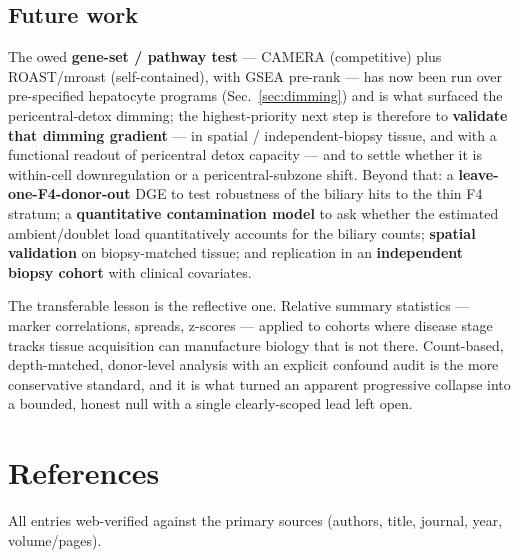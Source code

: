 \documentclass[11pt,a4paper]{article}
\begin{document}
\subsection{Future work}

The owed \textbf{gene-set / pathway test} --- CAMERA (competitive) plus ROAST/mroast (self-contained), with GSEA pre-rank --- has now been run over pre-specified hepatocyte programs (Sec.\ \ref{sec:dimming}) and is what surfaced the pericentral-detox dimming; the highest-priority next step is therefore to \textbf{validate that dimming gradient} --- in spatial / independent-biopsy tissue, and with a functional readout of pericentral detox capacity --- and to settle whether it is within-cell downregulation or a pericentral-subzone shift. Beyond that: a \textbf{leave-one-F4-donor-out} DGE to test robustness of the biliary hits to the thin F4 stratum; a \textbf{quantitative contamination model} to ask whether the estimated ambient/doublet load quantitatively accounts for the biliary counts; \textbf{spatial validation} on biopsy-matched tissue; and replication in an \textbf{independent biopsy cohort} with clinical covariates.

The transferable lesson is the reflective one. Relative summary statistics --- marker correlations, spreads, z-scores --- applied to cohorts where disease stage tracks tissue acquisition can manufacture biology that is not there. Count-based, depth-matched, donor-level analysis with an explicit confound audit is the more conservative standard, and it is what turned an apparent progressive collapse into a bounded, honest null with a single clearly-scoped lead left open.

\FloatBarrier
\section{References}

All entries web-verified against the primary sources (authors, title, journal, year, volume/pages).
\end{document}
